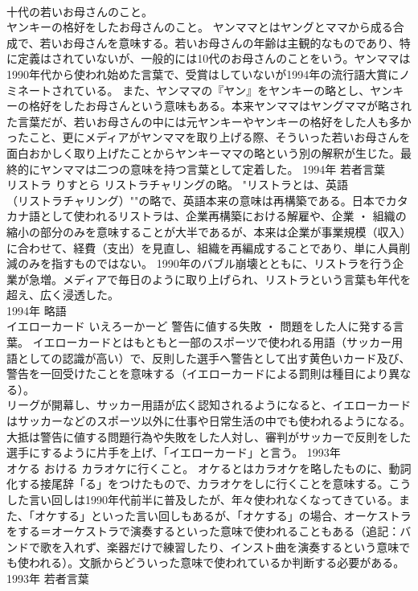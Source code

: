 \documentclass[8pt]{extreport}
\begin{document}
\begin{CJK}{UTF8}{min}
\\	十代の若いお母さんのこと。 
\\	ヤンキーの格好をしたお母さんのこと。	ヤンママとはヤングとママから成る合成で、若いお母さんを意味する。若いお母さんの年齢は主観的なものであり、特に定義はされていないが、一般的には10代のお母さんのことをいう。ヤンママは1990年代から使われ始めた言葉で、受賞はしていないが1994年の流行語大賞にノミネートされている。 また、ヤンママの『ヤン』をヤンキーの略とし、ヤンキーの格好をしたお母さんという意味もある。本来ヤンママはヤングママが略された言葉だが、若いお母さんの中には元ヤンキーやヤンキーの格好をした人も多かったこと、更にメディアがヤンママを取り上げる際、そういった若いお母さんを面白おかしく取り上げたことからヤンキーママの略という別の解釈が生じた。最終的にヤンママは二つの意味を持つ言葉として定着した。	1994年	若者言葉	
\\	リストラ	りすとら	リストラチャリングの略。	"リストラとは、英語
\\	（リストラチャリング）""の略で、英語本来の意味は再構築である。日本でカタカナ語として使われるリストラは、企業再構築における解雇や、企業 ・ 組織の縮小の部分のみを意味することが大半であるが、本来は企業が事業規模（収入）に合わせて、経費（支出）を見直し、組織を再編成することであり、単に人員削減のみを指すものではない。 1990年のバブル崩壊とともに、リストラを行う企業が急増。メディアで毎日のように取り上げられ、リストラという言葉も年代を超え、広く浸透した。
\\	1994年	略語	
\\	イエローカード	いえろーかーど	警告に値する失敗 ・ 問題をした人に発する言葉。	イエローカードとはもともと一部のスポーツで使われる用語（サッカー用語としての認識が高い）で、反則した選手へ警告として出す黄色いカード及び、警告を一回受けたことを意味する（イエローカードによる罰則は種目により異なる）。
\\	リーグが開幕し、サッカー用語が広く認知されるようになると、イエローカードはサッカーなどのスポーツ以外に仕事や日常生活の中でも使われるようになる。大抵は警告に値する問題行為や失敗をした人対し、審判がサッカーで反則をした選手にするように片手を上げ、「イエローカード」と言う。	1993年	
\\	オケる	おける	カラオケに行くこと。	オケるとはカラオケを略したものに、動詞化する接尾辞「る」をつけたもので、カラオケをしに行くことを意味する。こうした言い回しは1990年代前半に普及したが、年々使われなくなってきている。また、「オケする」といった言い回しもあるが、「オケする」の場合、オーケストラをする＝オーケストラで演奏するといった意味で使われることもある（追記：バンドで歌を入れず、楽器だけで練習したり、インスト曲を演奏するという意味でも使われる）。文脈からどういった意味で使われているか判断する必要がある。	1993年	若者言葉	

\end{CJK}
\end{document}
